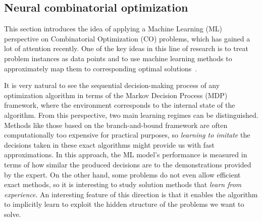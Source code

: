 \documentclass{article}
\theoremstyle{definition}
\theoremstyle{plain}
\begin{document}

\subsection{Neural combinatorial optimization}


This section introduces the idea of applying a Machine Learning (ML) perspective
on Combinatorial Optimization (CO) problems, which has gained a lot of
attention recently. One of the key ideas in this line of research is to treat problem
instances as data points and to use machine learning methods to approximately
map them to corresponding optimal solutions~\cite{bengioMachineLearningCombinatorial2020}.

It is very natural to see the sequential decision-making process of any
optimization algorithm in terms of the Markov Decision Process (MDP) framework,
where the environment corresponds to the internal state of the algorithm. From
this perspective, two main learning regimes can be distinguished.
Methods like those based on the branch-and-bound framework are
often computationally too expensive for practical purposes, so \textit{learning
  to imitate} the decisions taken in these exact algorithms might provide us
with fast approximations. In this approach, the ML model's performance is
measured in terms of how similar the produced decisions are to the
demonstrations provided by the expert.
On the other hand, some problems do not even allow efficient exact methods, so it is
interesting to study solution methods that \textit{learn from experience}. An
interesting feature of this direction is that it enables the algorithm to implicitly
learn to exploit the hidden structure of the problems we want to solve.
\end{document}
